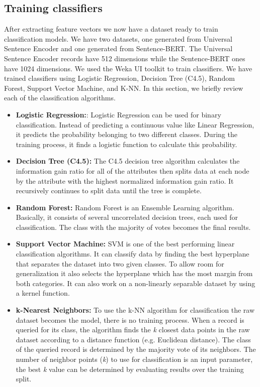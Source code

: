 \documentclass[conference]{IEEEtran}
\begin{document}
\subsection{Training classifiers}
After extracting feature vectors we now have a dataset ready to train classification models. We have two datasets,
one generated from Universal Sentence Encoder and one generated from Sentence-BERT. The Universal Sentence Encoder
records have 512 dimensions while the Sentence-BERT ones have 1024 dimensions. We used the Weka UI toolkit 
\cite{10.1145/1656274.1656278} to train classifiers. We have trained classifiers using Logistic Regression, 
Decision Tree (C4.5), Random Forest, Support Vector Machine, and K-NN. In this section, we briefly review each of the 
classification algorithms.
\begin{itemize}
  \item\textbf{Logistic Regression:}: Logistic Regression can be used for binary classification. Instead of 
  predicting a continuous value like Linear Regression, it predicts the probability belonging to two different 
  classes. During the training process, it finds a logistic function to calculate this probability.
  \item\textbf{Decision Tree (C4.5):} The C4.5 decision tree algorithm calculates the information gain ratio 
  for all of the attributes then splits data at each node by the attribute with the highest normalized 
  information gain ratio. It recursively continues to split data until the tree is complete.
  \item\textbf{Random Forest:} Random Forest is an Ensemble Learning algorithm. Basically, it consists of several 
  uncorrelated decision trees, each used for classification. The class with the majority of votes becomes 
  the final results.
  \item\textbf{Support Vector Machine:} SVM is one of the best performing linear classification algorithms. It can 
  classify data by finding the best hyperplane that separates the dataset into two given classes. To allow 
  room for generalization it also selects the hyperplane which has the most margin from both categories. It can 
  also work on a non-linearly separable dataset by using a kernel function.
  \item\textbf{k-Nearest Neighbors:} To use the k-NN algorithm for classification the raw dataset becomes the model,
  there is no training process. When a record is queried for its class, the algorithm finds the \textit{k} closest 
  data points in the raw dataset according to a distance function (e.g. Euclidean distance). The class of 
  the queried record is determined by the majority vote of its neighbors. The number of neighbor 
  points (\textit{k}) to use for classification is an input parameter, the best \textit{k} value can be 
  determined by evaluating results over the training split.
\end{itemize}
\end{document}
